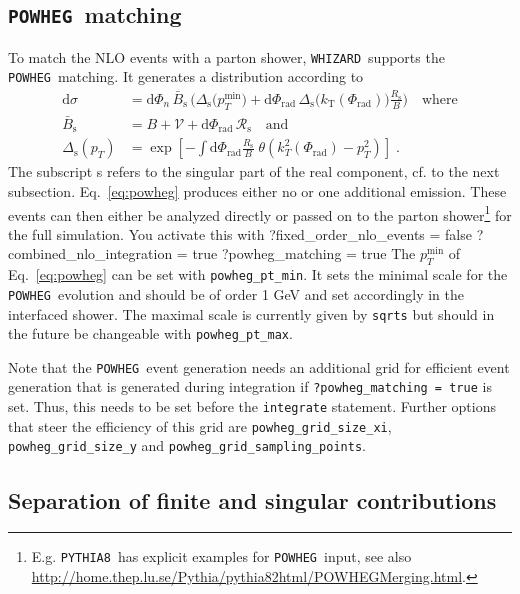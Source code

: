 \documentclass[12pt]{book}
\newenvironment{code}%
  {\begingroup\footnotesize
   \quote
   \Verbatim}%
  {\endVerbatim
   \endquote
   \endgroup\noindent}
\newcommand{\ttt}[1]{\texttt{#1}}
\newcommand{\whizard}{\ttt{WHIZARD}}
\newcommand{\pythiaeight}{\ttt{PYTHIA8}}
\newcommand{\powheg}{\ttt{POWHEG}}
\begin{document}
\subsection{\powheg\ matching}
To match the NLO events with a parton shower, \whizard\ supports
the  \powheg\ matching.  It generates a distribution according to
\begin{align}
  \label{eq:powheg}
  \text{d}\sigma &= \text{d}\Phi_n \,{\bar{B}_{\text{s}}}\,\biggl(
  {\Delta_{\text{s}}}(p_T^{\text{min}}\bigr) +
  \text{d}\Phi_{\text{rad}}\,{\Delta_{\text{s}}}(k_{\text{T}}(\Phi_{\text{rad}})\bigr)
  {\frac{R_{\text{s}}}B}\biggr) \quad \text{where} \\
  {\bar{B}_{\text{s}}} &= {B} + {\mathcal{V}} + \text{d}\Phi_{\text{rad}}\,
    {\mathcal{R}_{\text{s}}} \quad \text{and} \\
  {\Delta_{\text{s}}}(p_T) &= \exp\left[- \int{\text{d}\Phi_{\text{rad}}}
   {\frac{R_{\text{s}}}{B}}\; \theta\left(k_T^2(\Phi_{\text{rad}}) -
   p_T^2\right)\right]\;.
\end{align}
The subscript s refers to the singular part of the real component, cf.
to the next subsection.  Eq.~\eqref{eq:powheg} produces either no or one
additional emission.  These events can then either be analyzed directly
or passed on to the parton shower\footnote{E.g. \pythiaeight\ has
explicit examples for \powheg\ input, see also
\url{http://home.thep.lu.se/Pythia/pythia82html/POWHEGMerging.html}.}
for the full simulation.  You activate this with
\begin{code}
  ?fixed_order_nlo_events = false
  ?combined_nlo_integration = true
  ?powheg_matching = true
\end{code}
The $p_T^{\text{min}}$ of Eq.~\eqref{eq:powheg} can be set with
\ttt{powheg\_pt\_min}.  It sets the minimal scale for the \powheg\
evolution and should be of order 1 GeV and set accordingly in the
interfaced shower.  The maximal scale is currently given by \ttt{sqrts}
but should in the future be changeable with \ttt{powheg\_pt\_max}.

Note that the \powheg\ event generation needs an additional grid for
efficient event generation that is generated during integration if
\ttt{?powheg\_matching = true} is set. Thus, this needs to be set before
the \ttt{integrate} statement.
Further options that steer the efficiency of this grid are
\ttt{powheg\_grid\_size\_xi}, \ttt{powheg\_grid\_size\_y} and \ttt{powheg\_grid\_sampling\_points}.

\subsection{Separation of finite and singular contributions}
\end{document}

